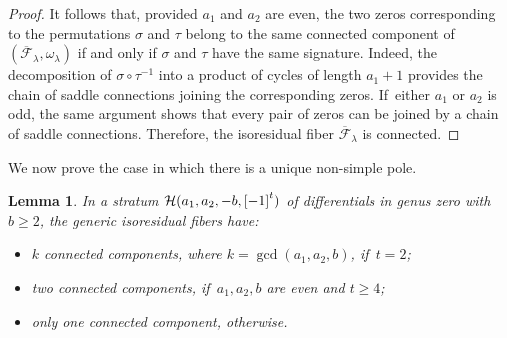 \documentclass[11pt]{article}
\newtheorem{lem}[thm]{Lemma}
\theoremstyle{definition}
\begin{document}
\begin{proof}
It follows that, provided $a_{1}$ and $a_{2}$ are even, the two zeros corresponding to the permutations $\sigma$ and $\tau$ belong to the same connected component of $(\overline{\mathcal{F}}_{\lambda}, \omega_\lambda)$ if and only if $\sigma$ and $\tau$ have the same signature. Indeed, the decomposition of $\sigma \circ \tau^{-1}$ into a product of cycles of length $a_{1}+1$ provides the chain of saddle connections joining the corresponding zeros. If~either $a_{1}$ or $a_{2}$ is odd, the same argument shows that every pair of zeros can be joined by a chain of saddle connections. Therefore, the isoresidual fiber $\overline{\mathcal{F}}_{\lambda}$ is connected.
\end{proof}

We now prove the case in which there is a unique non-simple pole.

\begin{lem}\label{lem:MAIN51big}
In a stratum $\mathcal{H}(a_{1},a_{2},-b,\rec[-1][t])$ of differentials in genus zero with $b\geq2$, the generic isoresidual fibers have:
\begin{itemize}
\item $k$ connected components, where $k=\gcd(a_{1},a_{2},b)$, if~$t=2$;
\item two connected components, if~$a_{1},a_{2},b$ are even and $t \geq 4$;
\item only one connected component, otherwise.
\end{itemize}
\end{lem}
\end{document}
